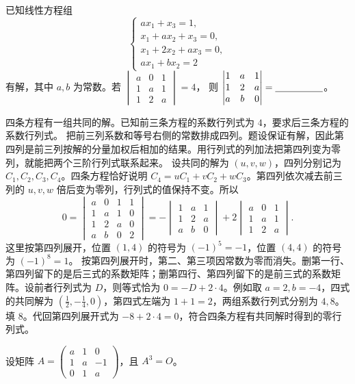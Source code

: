 \documentclass[UTF8,zihao=-4,fontset=fandol]{ctexart}
\begin{document}
已知线性方程组
\[
\begin{cases}
ax_1+x_3=1,\\
x_1+ax_2+x_3=0,\\
x_1+2x_2+ax_3=0,\\
ax_1+bx_2=2
\end{cases}
\]
有解，其中 $a,b$ 为常数。若
$\begin{vmatrix}a&0&1\\1&a&1\\1&2&a\end{vmatrix}=4$，
则 $\begin{vmatrix}1&a&1\\1&2&a\\a&b&0\end{vmatrix}=\underline{\hspace{5em}}$。

\Solution
\Known 四条方程有一组共同的解。已知前三条方程的系数行列式为 $4$，要求后三条方程的系数行列式。
\Method 把前三列系数和等号右侧的常数排成四列。题设保证有解，因此第四列是前三列按解的分量加权后相加的结果。用行列式的列加法把第四列变为零列，就能把两个三阶行列式联系起来。
\Derive 设共同的解为 $(u,v,w)$，四列分别记为 $C_1,C_2,C_3,C_4$。四条方程恰好说明 $C_4=uC_1+vC_2+wC_3$。第四列依次减去前三列的 $u,v,w$ 倍后变为零列，行列式的值保持不变。所以
\[
0=\begin{vmatrix}
a&0&1&1\\
1&a&1&0\\
1&2&a&0\\
a&b&0&2
\end{vmatrix}
=-\begin{vmatrix}1&a&1\\1&2&a\\a&b&0\end{vmatrix}
 +2\begin{vmatrix}a&0&1\\1&a&1\\1&2&a\end{vmatrix}.
\]
这里按第四列展开，位置 $(1,4)$ 的符号为 $(-1)^5=-1$，位置 $(4,4)$ 的符号为 $(-1)^8=1$。
按第四列展开时，第二、第三项因常数为零而消失。删第一行、第四列留下的是后三式的系数矩阵；删第四行、第四列留下的是前三式的系数矩阵。设前者行列式为 $D$，则等式恰为 $0=-D+2\cdot4$。例如取 $a=2,b=-4$，四式的共同解为 $(\frac{1}{2},-\frac{1}{4},0)$，第四式左端为 $1+1=2$，两组系数行列式分别为 $4,8$。
\Verify 填 $\boxed{8}$。代回第四列展开式为 $-8+2\cdot4=0$，符合四条方程有共同解时得到的零行列式。

设矩阵 $A=\begin{pmatrix}a&1&0\\1&a&-1\\0&1&a\end{pmatrix}$，且 $A^3=O$。
\end{document}
